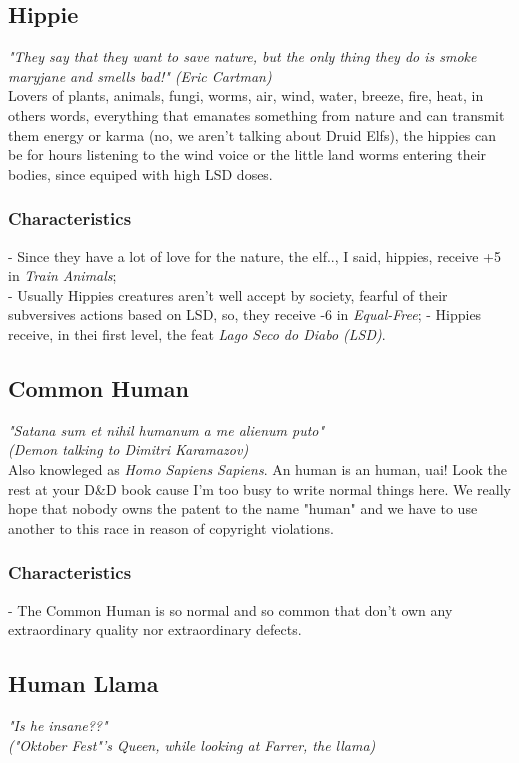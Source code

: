 \documentclass[ letterpaper,12pt]{article}
\begin{document}
\subsection{Hippie}
{\it "They say that they want to save nature, but the only thing they do is smoke maryjane and smells bad!" (Eric Cartman)}\\

Lovers of plants, animals, fungi, worms, air, wind, water, breeze, fire, heat, in others words, everything that emanates something from nature and can transmit them energy or karma (no, we aren't talking about Druid Elfs), the hippies can be for hours listening to the wind voice or the little land worms entering their bodies, since equiped with high LSD doses.\\

\subsubsection{Characteristics}
- Since they have a lot of love for the nature, the elf.., I said, hippies, receive +5 in {\it Train Animals};\\
- Usually Hippies creatures aren't well accept by society, fearful of their subversives actions based on LSD, so, they receive -6 in {\it Equal-Free};
- Hippies receive, in thei first level, the feat {\it Lago Seco do Diabo (LSD)}.

\subsection{Common Human}
{\it "Satana sum et nihil humanum a me alienum puto"\\
 (Demon talking to Dimitri Karamazov)}\\

Also knowleged as {\it Homo Sapiens Sapiens}. An human is an human, uai! Look the rest at your D\&D book cause I'm too busy to write normal things here. We really hope that nobody owns the patent to the name "human" and we have to use another to this race in reason of copyright violations.

\subsubsection{Characteristics}
- The Common Human is so normal and so common that don't own any extraordinary quality nor extraordinary defects.

\subsection{Human Llama}
{\it "Is he insane??"\\
("Oktober Fest"'s Queen, while looking at Farrer, the llama)}\\
\end{document}
